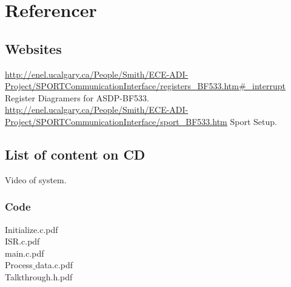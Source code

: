 \chapter{Referencer}
\section{Websites}
\url{http://enel.ucalgary.ca/People/Smith/ECE-ADI-Project/SPORTCommunicationInterface/registers_BF533.htm#_interrupt}
Register Diagramers for ASDP-BF533.\\
\url{http://enel.ucalgary.ca/People/Smith/ECE-ADI-Project/SPORTCommunicationInterface/sport_BF533.htm}
Sport Setup.\\

\section{List of content on CD}
Video of system.

\subsection{Code}
Initialize.c.pdf\\
ISR.c.pdf\\
main.c.pdf\\
Process$\_$data.c.pdf\\
Talkthrough.h.pdf\\